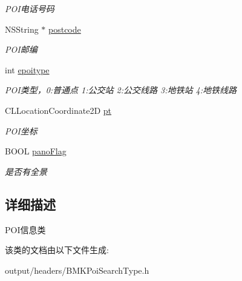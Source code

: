 \begin{DoxyCompactItemize}
\begin{DoxyCompactList}\small\item\em P\+O\+I电话号码 \end{DoxyCompactList}\item 
\hypertarget{interface_b_m_k_poi_info_a696c50cfef411e4c8aa4a53693c26dc5}{}N\+S\+String $\ast$ \hyperlink{interface_b_m_k_poi_info_a696c50cfef411e4c8aa4a53693c26dc5}{postcode}\label{interface_b_m_k_poi_info_a696c50cfef411e4c8aa4a53693c26dc5}

\begin{DoxyCompactList}\small\item\em P\+O\+I邮编 \end{DoxyCompactList}\item 
\hypertarget{interface_b_m_k_poi_info_ada3ccb40708069fe5d82414af8de1ab5}{}int \hyperlink{interface_b_m_k_poi_info_ada3ccb40708069fe5d82414af8de1ab5}{epoitype}\label{interface_b_m_k_poi_info_ada3ccb40708069fe5d82414af8de1ab5}

\begin{DoxyCompactList}\small\item\em P\+O\+I类型，0\+:普通点 1\+:公交站 2\+:公交线路 3\+:地铁站 4\+:地铁线路 \end{DoxyCompactList}\item 
\hypertarget{interface_b_m_k_poi_info_a6ace0b9f9462c1695317654d92c3795a}{}C\+L\+Location\+Coordinate2\+D \hyperlink{interface_b_m_k_poi_info_a6ace0b9f9462c1695317654d92c3795a}{pt}\label{interface_b_m_k_poi_info_a6ace0b9f9462c1695317654d92c3795a}

\begin{DoxyCompactList}\small\item\em P\+O\+I坐标 \end{DoxyCompactList}\item 
\hypertarget{interface_b_m_k_poi_info_a19f16330745065f95760fda53c4d3940}{}B\+O\+O\+L \hyperlink{interface_b_m_k_poi_info_a19f16330745065f95760fda53c4d3940}{pano\+Flag}\label{interface_b_m_k_poi_info_a19f16330745065f95760fda53c4d3940}

\begin{DoxyCompactList}\small\item\em 是否有全景 \end{DoxyCompactList}\end{DoxyCompactItemize}


\subsection{详细描述}
P\+O\+I信息类 

该类的文档由以下文件生成\+:\begin{DoxyCompactItemize}
\item 
output/headers/B\+M\+K\+Poi\+Search\+Type.\+h\end{DoxyCompactItemize}
